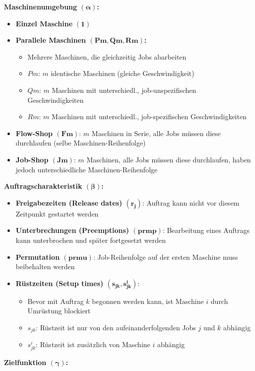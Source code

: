 \bigskip
\textbf{Maschinenumgebung $\boldsymbol{(\alpha)}$:}
\begin{itemize}
	\item \textbf{Einzel Maschine} $\boldsymbol{(1)}$
	\item \textbf{Parallele Maschinen $\boldsymbol{(Pm, Qm, Rm)}$:}
	\begin{itemize}
		\item Mehrere Maschinen, die gleichzeitig Jobs abarbeiten
		\item $Pm$: $m$ identische Maschinen (gleiche Geschwindigkeit)
		\item $Qm$: $m$ Maschinen mit unterschiedl., job-unspezifischen Geschwindigkeiten
		\item $Rm$: $m$ Maschinen mit unterschiedl., job-spezifischen Geschwindigkeiten
	\end{itemize}
	\item \textbf{Flow-Shop $\boldsymbol{(Fm)}$}: $m$ Maschinen in Serie, alle Jobs müssen diese durchlaufen (selbe Maschinen-Reihenfolge)
	\item \textbf{Job-Shop $\boldsymbol{(Jm)}$}: $m$ Maschinen, alle Jobs müssen diese durchlaufen, haben jedoch unterschiedliche Maschinen-Reihenfolge
\end{itemize}
\bigskip
\textbf{Auftragscharakteristik $\boldsymbol{(\beta)}$:}
\begin{itemize}
	\item \textbf{Freigabezeiten (Release dates) $\boldsymbol{(r_j)}$}: Auftrag kann nicht vor diesem Zeitpunkt gestartet werden
	\item \textbf{Unterbrechungen (Preemptions) $\boldsymbol{(prmp)}$}: Bearbeitung eines Auftrags kann unterbrochen und später fortgesetzt werden
	\item \textbf{Permutation $\boldsymbol{(prmu)}$}: Job-Reihenfolge auf der ersten Maschine muss beibehalten werden
	\item \textbf{Rüstzeiten (Setup times) $\boldsymbol{(s_{jk}, s_{jk}^i)}$}:
	\begin{itemize}
		\item Bevor mit Auftrag $k$ begonnen werden kann, ist Maschine $i$ durch Umrüstung blockiert
		\item $s_{jk}$: Rüstzeit ist nur von den aufeinanderfolgenden Jobs $j$ und $k$ abhängig
		\item $s_{jk}^i$: Rüstzeit ist zusätzlich von Maschine $i$ abhängig
	\end{itemize}
\end{itemize}
\bigskip
\textbf{Zielfunktion $\boldsymbol{(\gamma)}$:}
